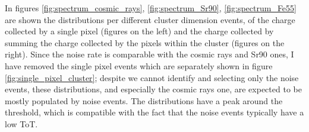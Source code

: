         In figures \ref{fig:spectrum_cosmic_rays}, \ref{fig:spectrum_Sr90}, \ref{fig:spectrum_Fe55} are shown the distributions per different cluster dimension events, of the charge collected by a single pixel (figures on the left) and the charge collected by summing the charge collected by the pixels within the cluster (figures on the right). 
        Since the noise rate is comparable with the cosmic rays and Sr90 ones, I have removed the single pixel events which are separately shown in figure \ref{fig:single_pixel_cluster}; despite we cannot identify and selecting only the noise events, these distributions, and especially the cosmic rays one, are expected to be mostly populated by noise events.  
        The distributions have a peak around the threshold, which is compatible with the fact that the noise events typically have a low ToT. 
    
